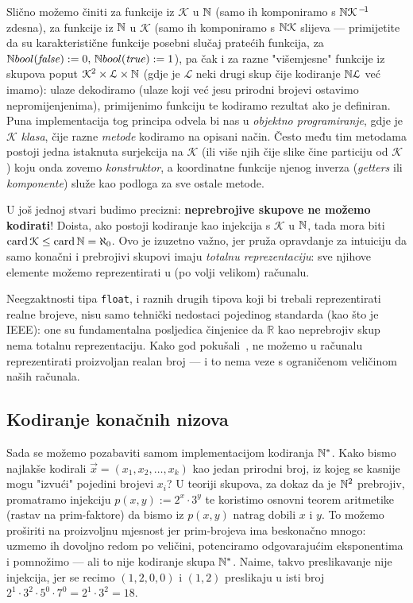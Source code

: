 Slično možemo činiti za funkcije iz $\mathcal K$ u ${\mathbb N}$ (samo ih komponiramo s ${\mathbb N}\mathcal K^{\,-\!1}$ zdesna), za funkcije iz ${\mathbb N}$ u $\mathcal K$ (samo ih komponiramo s ${{\mathbb N}\mathcal K}$ slijeva --- primijetite da su karakteristične funkcije posebni slučaj pratećih funkcija, za ${\mathbb N} bool(\mathit{false}):=0,\,{\mathbb N} bool(\mathit{true}):=1$), pa čak i za razne "višemjesne" funkcije iz skupova poput $\mathcal K^2\times \mathcal L\times{\mathbb N}$ (gdje je $\mathcal L$ neki drugi skup čije kodiranje ${\mathbb N}\mathcal L$ već imamo): ulaze dekodiramo (ulaze koji već jesu prirodni brojevi ostavimo nepromijenjenima), primijenimo funkciju te kodiramo rezultat ako je definiran. Puna implementacija tog principa odvela bi nas u \emph{objektno programiranje}, gdje je $\mathcal K$ \emph{klasa}, čije razne \emph{metode} kodiramo na opisani način. Često među tim metodama postoji jedna istaknuta surjekcija na $\mathcal K$ (ili više njih čije slike čine particiju od $\mathcal K$) koju onda zovemo \emph{konstruktor}, a koordinatne funkcije njenog inverza (\emph{getters} ili \emph{komponente}) služe kao podloga za sve ostale metode.

\begin{napomena}[{name=[ne možemo kodirati neprebrojive skupove]}]
U još jednoj stvari budimo precizni: \textbf{neprebrojive skupove ne možemo kodirati}! Doista, ako postoji kodiranje kao injekcija s $\mathcal K$ u ${\mathbb N}$, tada mora biti $\operatorname{card}\mathcal K\le\operatorname{card}{\mathbb N}=\aleph_0$. Ovo je izuzetno važno, jer pruža opravdanje za intuiciju da samo konačni i prebrojivi skupovi imaju \emph{totalnu reprezentaciju}: sve njihove elemente možemo reprezentirati u (po volji velikom) računalu.

Neegzaktnosti tipa \texttt{float}, i raznih drugih tipova koji bi trebali reprezentirati realne brojeve, nisu samo tehnički nedostaci pojedinog standarda (kao što je IEEE): one su fundamentalna posljedica činjenice da $\mathbb R$ kao neprebrojiv skup nema totalnu reprezentaciju. Kako god pokušali~\cite{url:calc}, ne možemo u računalu reprezentirati proizvoljan realan broj --- i to nema veze s ograničenom veličinom naših računala.
\end{napomena}

\subsection{Kodiranje konačnih nizova}
Sada se možemo pozabaviti samom implementacijom kodiranja ${\mathbb N}^*$. Kako bismo najlakše kodirali $\vec x=(x_1,x_2,\dotsc,x_k)$ kao jedan prirodni broj, iz kojeg se kasnije mogu "izvući" pojedini brojevi $x_i$? U teoriji skupova, za dokaz da je ${\mathbb N}^2$ prebrojiv, promatramo injekciju $p(x,y):=2^x\cdot3^y$ te koristimo osnovni teorem aritmetike (rastav na prim-faktore) da bismo iz $p(x,y)$ natrag dobili $x$ i $y$. To možemo proširiti na proizvoljnu mjesnost jer prim-brojeva ima beskonačno mnogo: uzmemo ih dovoljno redom po veličini, potenciramo odgovarajućim eksponentima i pomnožimo --- ali to nije kodiranje skupa ${\mathbb N}^*$. Naime, takvo preslikavanje nije injekcija, jer se recimo $(1,2,0,0)$ i $(1,2)$ preslikaju u isti broj $2^1\cdot3^2\cdot5^0\cdot7^0=2^1\cdot3^2=18$.

